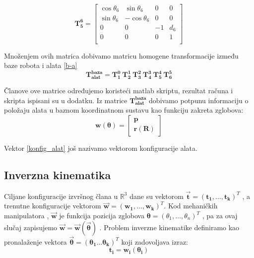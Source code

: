 \documentclass[times, utf8, diplomski, numeric]{fer}
\begin{document}
\begin{equation}
\mathbf{T_5^6} =\begin{bmatrix} \cos\theta_{6}& \sin\theta_{6} & 0 & 0\\ 
\sin\theta_{6}& -\cos\theta_{6} & 0 & 0\\ 
0 & 0 & -1 & d_{6}\\
0 & 0 & 0 & 1\\
\end{bmatrix}
\end{equation}

Množenjem ovih matrica dobivamo matricu homogene transformacije između baze robota i alata \ref{b-a}
\begin{equation}
\mathbf{T_{alat}^{baza}} = \mathbf{T_1^0}\ \mathbf{T_2^1}\ \mathbf{T_3^2}\ \mathbf{T_4^3}\ \mathbf{T_5^4}\ \mathbf{T_6^5}
\label{b-a}
\end{equation}

Članove ove matrice određujemo koristeći matlab skriptu, rezultat računa i skripta ispisani su u dodatku.
Iz matrice $\mathbf{T_{alat}^{baza}}$ dobivamo potpunu informaciju o položaju alata u baznom koordinatnom sustavu kao funkciju zakreta zglobova:
\begin{equation}
\mathbf{w}(\bm \theta) = 
\begin{bmatrix}
\mathbf{p}\\
\mathbf{r}(\mathbf{R})
\end{bmatrix}
\label{konfig_alat}
\end{equation}

Vektor \ref{konfig_alat} još nazivamo vektorom konfiguracije alata.

\subsection{Inverzna kinematika}
Ciljane konfiguracije izvršnog člana u $\mathbb{R}^{3}$ dane su vektorom $\vec{\mathbf{t}} = (\mathbf{t_1}, \ldots , \mathbf{t_k})^{T}$ , a trenutne konfiguracije vektorom
$\vec{\mathbf{w}} = (\mathbf{w_1}, \ldots , \mathbf{w_k})^{T}$. Kod mehaničkih manipulatora , $\vec{\mathbf{w}}$ je funkcija pozicija zglobova ${\bm{\theta}} = (\theta_{1}, \ldots , \theta_{n})^{T}$ , pa za ovaj slučaj zapisujemo $\vec{\mathbf{w}}=\vec{\mathbf{w}}\left({\vec{\bm{\theta}}}\right) $ . Problem inverzne kinematike definiramo kao pronalaženje vektora $\vec{\bm{\theta}} = (\bm{\theta_1} \ldots \bm{\theta_k})^T$ koji zadovoljava izraz:
\begin{equation}
\mathbf{t_i} = \mathbf{w_i}(\bm{\theta}_{\mathbf{i}})
\label{inverzna_def}
\end{equation}
\end{document}
